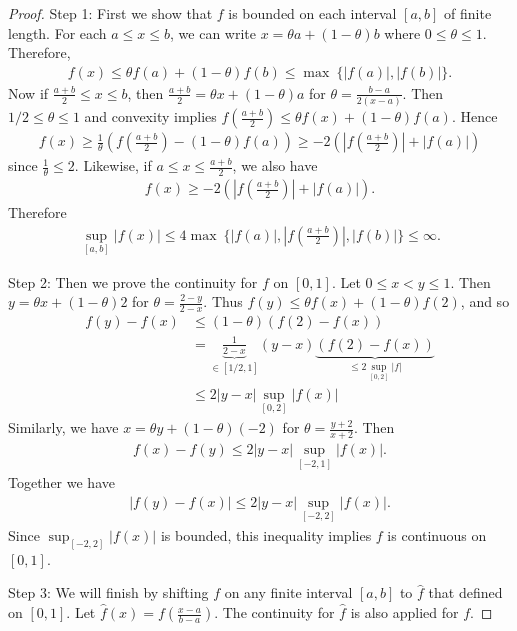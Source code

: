 \begin{proof}
Step 1:
First we show that $f$ is bounded on each interval $[a, b]$ of finite length.
For each $a \le x \le b$, we can write $x = \theta a + (1-\theta) b$ where $0 \le \theta \le 1$.
Therefore,
\begin{align}
f(x) \le \theta f(a) + (1-\theta) f(b) \le \max \ \{ 
|f(a)|, |f(b)| \}.
\end{align}
Now if $\frac{a+b}{2} \le x \le b$, then $\frac{a+b}{2} = \theta x + (1-\theta) a$ for $\theta = \frac{b-a}{2(x-a)}$.
Then $1/2 \le \theta \le 1$ and convexity implies $f(\frac{a+b}{2}) \le \theta f(x) + (1-\theta) f(a)$.
Hence
\begin{align}
f(x) \ge \frac{1}{\theta} \left( f(\frac{a+b}{2}) - (1-\theta) f(a) \right) \ge -2 \left( |f(\frac{a+b}{2})| + |f(a)| \right)
\end{align}
since $\frac{1}{\theta} \le 2$.
Likewise, if $a \le x \le \frac{a+b}{2}$, we also have
\begin{align}
f(x) \ge -2 \left( |f(\frac{a+b}{2})| + |f(a)| \right).
\end{align}
Therefore
\begin{align}
\sup_{[a, b]} |f(x)| \le 4 \max \ \{ |f(a)|, |f(\frac{a+b}{2})|, |f(b)| \} \le \infty.
\end{align}

Step 2:
Then we prove the continuity for $f$ on $[0, 1]$.
Let $0 \le x < y \le 1$.
Then $y = \theta x + (1-\theta) 2$ for $\theta = \frac{2-y}{2-x}$.
Thus $f(y) \le \theta f(x) + (1-\theta) f(2)$, and so
\begin{align}
f(y) - f(x) & \le (1-\theta)(f(2) -f(x)) \\
& = \underbrace{\frac{1}{2-x}}_{\in [1/2, 1]} (y-x) \underbrace{(f(2) - f(x))}_{\le 2 \sup_{[0, 2]} |f|} \\
& \le 2 |y-x| \sup _{[0, 2]} |f(x)|
\end{align}
Similarly, we have $x = \theta y + (1-\theta) (-2)$ for $\theta = \frac{y+2}{x+2}$.
Then
\begin{align}
f(x) - f(y) \le 2 |y-x| \sup _{[-2, 1]} |f(x)|.
\end{align}
Together we have
\begin{align}
|f(y) - f(x)| \le 2 |y-x| \sup _{[-2, 2]} |f(x)|.
\end{align}
Since $\sup _{[-2, 2]} |f(x)|$ is bounded, this inequality implies $f$ is continuous on $[0, 1]$.

Step 3:
We will finish by shifting $f$ on any finite interval $[a, b]$ to $\hat{f}$ that defined on $[0, 1]$.
Let $\hat{f}(x) = f(\frac{x-a}{b-a})$.
The continuity for $\hat{f}$ is also applied for $f$.
\end{proof}

